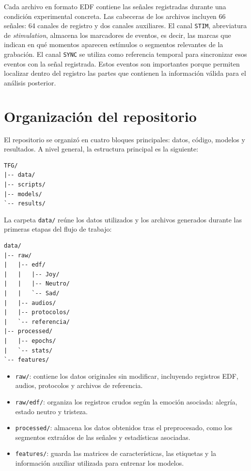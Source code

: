 Cada archivo en formato \ac{EDF} contiene las señales registradas durante una condición experimental concreta. Las cabeceras de los archivos incluyen 66 señales: 64 canales de registro y dos canales auxiliares. El canal \texttt{STIM}, abreviatura de \textit{stimulation}, almacena los marcadores de eventos, es decir, las marcas que indican en qué momentos aparecen estímulos o segmentos relevantes de la grabación. El canal \texttt{SYNC} se utiliza como referencia temporal para sincronizar esos eventos con la señal registrada. Estos eventos son importantes porque permiten localizar dentro del registro las partes que contienen la información válida para el análisis posterior.


\section{Organización del repositorio}

El repositorio se organizó en cuatro bloques principales: datos, código, modelos y resultados. A nivel general, la estructura principal es la siguiente:

\begin{lstlisting}
TFG/
|-- data/
|-- scripts/
|-- models/
`-- results/
\end{lstlisting}

La carpeta \texttt{data/} reúne los datos utilizados y los archivos generados durante las primeras etapas del flujo de trabajo:

\begin{lstlisting}
data/
|-- raw/
|   |-- edf/
|   |   |-- Joy/
|   |   |-- Neutro/
|   |   `-- Sad/
|   |-- audios/
|   |-- protocolos/
|   `-- referencia/
|-- processed/
|   |-- epochs/
|   `-- stats/
`-- features/
\end{lstlisting}

\begin{itemize}
    \item \texttt{raw/}: contiene los datos originales sin modificar, incluyendo registros \ac{EDF}, audios, protocolos y archivos de referencia.
    \item \texttt{raw/edf/}: organiza los registros crudos según la emoción asociada: alegría, estado neutro y tristeza.
    \item \texttt{processed/}: almacena los datos obtenidos tras el preprocesado, como los segmentos extraídos de las señales y estadísticas asociadas.
    \item \texttt{features/}: guarda las matrices de características, las etiquetas y la información auxiliar utilizada para entrenar los modelos.
\end{itemize}

